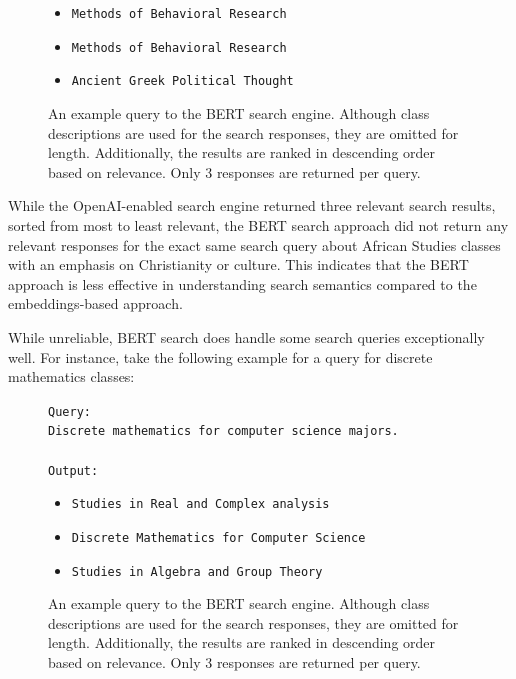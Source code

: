 \documentclass[
	a4paper, %
	10pt, %
	unnumberedsections, %
	twoside, %
]{LTJournalArticle}
\begin{document}
\begin{figure}
	\begin{center}
		\begin{itemize}
			\item \texttt{Methods of Behavioral Research}
			\item \texttt{Methods of Behavioral Research}
			\item \texttt{Ancient Greek Political Thought}
		\end{itemize}		
	\end{center}

	\caption{An example query to the BERT search engine. Although class descriptions are used for the search responses, they are omitted for length. Additionally, the results are ranked in descending order based on relevance. Only 3 responses are returned per query.}
	\label{fig:ex6}
\end{figure}


While the OpenAI-enabled search engine returned three relevant search results, sorted from most to least relevant, the BERT search approach did not return any relevant responses for the exact same search query about African Studies classes with an emphasis on Christianity or culture. This indicates that the BERT approach is less effective in understanding search semantics compared to the embeddings-based approach. 

While unreliable, BERT search does handle some search queries exceptionally well. For instance, take the following example for a query for discrete mathematics classes:

\begin{figure}[h]
	\begin{center}
		\texttt{Query:} \\
		\texttt{Discrete mathematics for computer science majors.} \\
		\texttt{}\\
		\texttt{Output:} 
		\begin{itemize}
			\item \texttt{Studies in Real and Complex analysis}
			\item \texttt{Discrete Mathematics for Computer Science}
			\item \texttt{Studies in Algebra and Group Theory}
		\end{itemize}		
	\end{center}
	\caption{An example query to the BERT search engine. Although class descriptions are used for the search responses, they are omitted for length. Additionally, the results are ranked in descending order based on relevance. Only 3 responses are returned per query.}
\end{figure}
\end{document}
